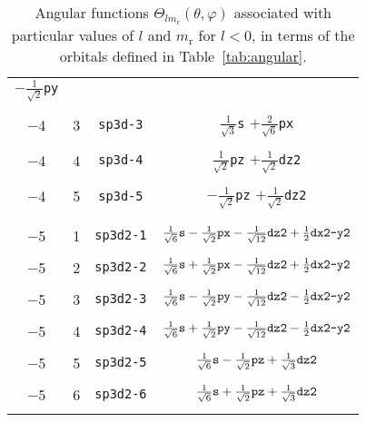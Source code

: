 \begin{table}
\begin{center}
\begin{tabular}{|cccc|}
$-\frac{1}{\sqrt{2}}$\verb#py#\\
&&&\\
 $-$4  &  3  &  \verb#sp3d-3#  &
$\frac{1}{\sqrt{3}}$\verb#s# $+\frac{2}{\sqrt{6}}$\verb#px#\\
&&&\\
 $-$4  &  4  &  \verb#sp3d-4#  & 
$\frac{1}{\sqrt{2}}$\verb#pz# $+\frac{1}{\sqrt{2}}$\verb#dz2#\\
&&&\\
 $-$4  &  5  &  \verb#sp3d-5#  & 
$-\frac{1}{\sqrt{2}}$\verb#pz# $+\frac{1}{\sqrt{2}}$\verb#dz2#\\
&&&\\\hline&&&\\
 $-$5  &  1  &  \verb#sp3d2-1# &   
$\frac{1}{\sqrt{6}}\verb#s#-\frac{1}{\sqrt{2}}\verb#px#
-\frac{1}{\sqrt{12}}\verb#dz2#+\frac{1}{2}\verb#dx2-y2#$ \\
&&&\\
 $-$5  &  2  &  \verb#sp3d2-2# &   
$\frac{1}{\sqrt{6}}\verb#s#+\frac{1}{\sqrt{2}}\verb#px#
-\frac{1}{\sqrt{12}}\verb#dz2#+\frac{1}{2}\verb#dx2-y2#$ \\
&&&\\
 $-$5  &  3  &  \verb#sp3d2-3# &   
$\frac{1}{\sqrt{6}}\verb#s#-\frac{1}{\sqrt{2}}\verb#py#
-\frac{1}{\sqrt{12}}\verb#dz2#-\frac{1}{2}\verb#dx2-y2#$ \\
&&&\\
 $-$5  &  4  &  \verb#sp3d2-4# &   
$\frac{1}{\sqrt{6}}\verb#s#+\frac{1}{\sqrt{2}}\verb#py#
-\frac{1}{\sqrt{12}}\verb#dz2#-\frac{1}{2}\verb#dx2-y2#$ \\
&&&\\
 $-$5  &  5  &  \verb#sp3d2-5# &   
$\frac{1}{\sqrt{6}}\verb#s#-\frac{1}{\sqrt{2}}\verb#pz#
+\frac{1}{\sqrt{3}}\verb#dz2#$ \\
&&&\\
 $-$5  &  6  &  \verb#sp3d2-6# &  
$\frac{1}{\sqrt{6}}\verb#s#+\frac{1}{\sqrt{2}}\verb#pz#
+\frac{1}{\sqrt{3}}\verb#dz2#$ \\
&&&\\\hline\hline
\end{tabular}
\caption{Angular functions
$\Theta_{lm_{\mathrm{r}}}(\theta,\varphi)$
associated with particular values of $l$ and $m_{\mathrm{r}}$ for
$l<0$, in terms of the orbitals defined in Table~\ref{tab:angular}.
\label{tab:hybrids}}
\end{center}
\end{table}


